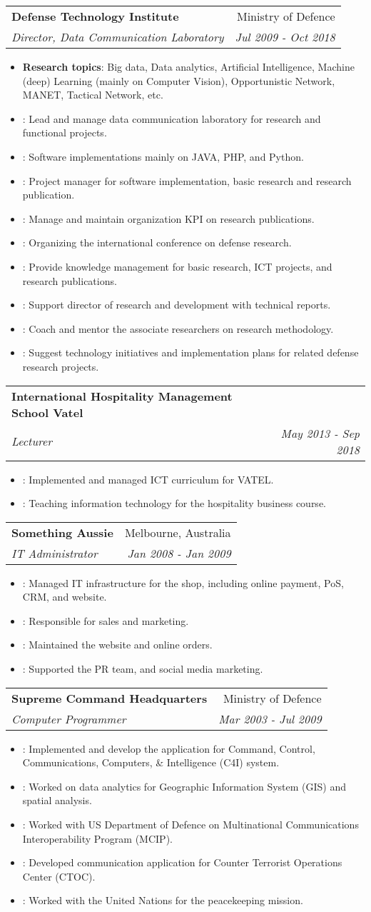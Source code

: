 \documentclass[letterpaper,11pt]{article}
\makeatletter
\newcommand{\resumeItem}[2]{
  \item\small{
    \textbf{#1}{: #2 \vspace{-2pt}}
  }
}
\newcommand{\resumeSubheading}[4]{
  \vspace{-1pt}\item
    \begin{tabular*}{0.97\textwidth}[t]{l@{\extracolsep{\fill}}r}
      \textbf{#1} & #2 \\
      \textit{\small#3} & \textit{\small #4} \\
    \end{tabular*}\vspace{-5pt}
}
\newcommand{\resumeItemListStart}{\begin{itemize}}
\newcommand{\resumeItemListEnd}{\end{itemize}\vspace{-5pt}}
\makeatother
\begin{document}
    \resumeSubheading
      {Defense Technology Institute}{Ministry of Defence}
      {Director, Data Communication Laboratory}{Jul 2009 - Oct 2018}
      \resumeItemListStart
        \resumeItem{Research topics}
          {Big data, Data analytics, Artificial Intelligence, Machine (deep) Learning (mainly on Computer Vision), Opportunistic Network, MANET, Tactical Network, etc.}
        \resumeItem{}
          {Lead and manage data communication laboratory for research and functional projects.}
        \resumeItem{}
          {Software implementations mainly on JAVA, PHP, and Python.}
        \resumeItem{}
          {Project manager for software implementation, basic research and research publication.}
        \resumeItem{}
          {Manage and maintain organization KPI on research publications.}
        \resumeItem{}
          {Organizing the international conference on defense research.}
        \resumeItem{}
          {Provide knowledge management for basic research, ICT projects, and research publications.}
        \resumeItem{}
          {Support director of research and development with technical reports.}
        \resumeItem{}
          {Coach and mentor the associate researchers on research methodology.}
        \resumeItem{}
          {Suggest technology initiatives and implementation plans for related defense research projects.}
      \resumeItemListEnd

    \resumeSubheading
      {International Hospitality Management School Vatel}{}
      {Lecturer}{May 2013 - Sep 2018}
      \resumeItemListStart
        \resumeItem{}
          { Implemented and managed ICT curriculum for VATEL.}
        \resumeItem{}
          {Teaching information technology for the hospitality business course.}
      \resumeItemListEnd

      \resumeSubheading
      {Something Aussie}{Melbourne, Australia}
      {IT Administrator}{Jan 2008 - Jan 2009}
      \resumeItemListStart
        \resumeItem{}
          {Managed IT infrastructure for the shop, including online payment, PoS, CRM, and website.}
        \resumeItem{}
          {Responsible for sales and marketing.}
        \resumeItem{}
          {Maintained the website and online orders.}
        \resumeItem{}
          {Supported the PR team, and social media marketing.}
      \resumeItemListEnd

    \resumeSubheading
      {Supreme Command Headquarters}{Ministry of Defence}
      {Computer Programmer}{Mar 2003 - Jul 2009}
      \resumeItemListStart
        \resumeItem{}
          {Implemented and develop the application for Command, Control, Communications, Computers, \& Intelligence (C4I) system.}
        \resumeItem{}
          {Worked on data analytics for Geographic Information System (GIS) and spatial analysis.}
        \resumeItem{}
          {Worked with US Department of Defence on Multinational Communications Interoperability Program (MCIP).}
        \resumeItem{}
          {Developed communication application for Counter Terrorist Operations Center (CTOC).}
        \resumeItem{}
          {Worked with the United Nations for the peacekeeping mission.}
      \resumeItemListEnd
\end{document}
